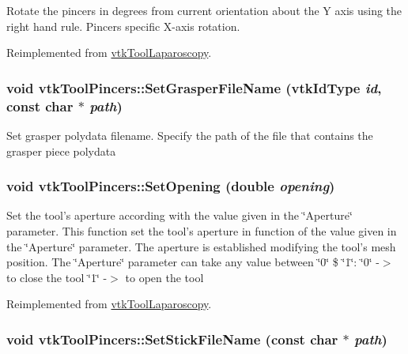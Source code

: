 Rotate the pincers in degrees from current orientation about the Y axis using the right hand rule. Pincers specific X-\/axis rotation. 

Reimplemented from \hyperlink{classvtkToolLaparoscopy_a3849ce4caa8283696433cb1ac0466bc5}{vtkToolLaparoscopy}.\hypertarget{classvtkToolPincers_a478f107b430191c0e1098e938b35b975}{
\subsubsection[{SetGrasperFileName}]{\setlength{\rightskip}{0pt plus 5cm}void vtkToolPincers::SetGrasperFileName (vtkIdType {\em id}, \/  const char $\ast$ {\em path})}}
\label{classvtkToolPincers_a478f107b430191c0e1098e938b35b975}


Set grasper polydata filename. Specify the path of the file that contains the grasper piece polydata \hypertarget{classvtkToolPincers_a6314454d06c23e49fe1908812441658f}{
\subsubsection[{SetOpening}]{\setlength{\rightskip}{0pt plus 5cm}void vtkToolPincers::SetOpening (double {\em opening})}}
\label{classvtkToolPincers_a6314454d06c23e49fe1908812441658f}


Set the tool's aperture according with the value given in the \char`\"{}Aperture\char`\"{} parameter. This function set the tool's aperture in function of the value given in the \char`\"{}Aperture\char`\"{} parameter. The aperture is established modifying the tool's mesh position. The \char`\"{}Aperture\char`\"{} parameter can take any value between \char`\"{}0\char`\"{} \$ \char`\"{}1\char`\"{}: \char`\"{}0\char`\"{} -\/$>$ to close the tool \char`\"{}1\char`\"{} -\/$>$ to open the tool 

Reimplemented from \hyperlink{classvtkToolLaparoscopy_a870cb47bfdd67a9aecaba2fb7fbfa0ba}{vtkToolLaparoscopy}.\hypertarget{classvtkToolPincers_a844db9dccd0034605ddd23de176ac9dc}{
\subsubsection[{SetStickFileName}]{\setlength{\rightskip}{0pt plus 5cm}void vtkToolPincers::SetStickFileName (const char $\ast$ {\em path})}}
\label{classvtkToolPincers_a844db9dccd0034605ddd23de176ac9dc}


